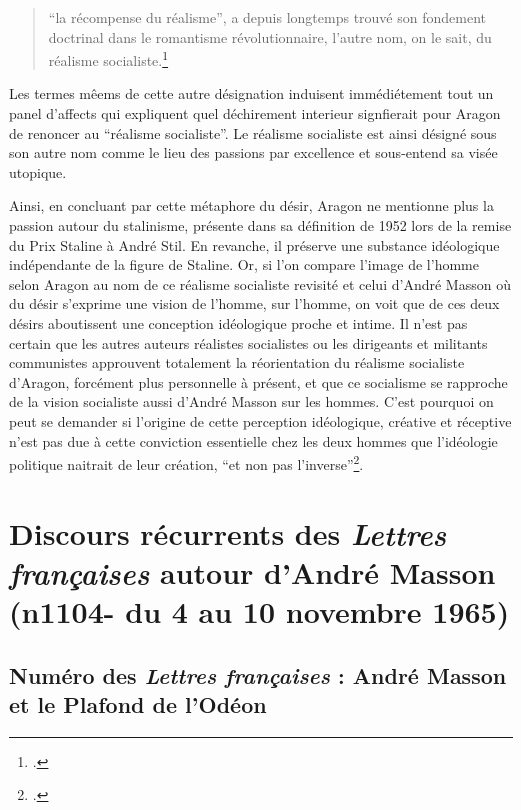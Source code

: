 \begin{quote}
\enquote{la récompense du réalisme}, a depuis longtemps trouvé son fondement doctrinal dans le romantisme révolutionnaire, l'autre nom, on le sait, du réalisme socialiste.\footcite[p1012]{these}\end{quote}

Les termes mêems de cette autre désignation induisent immédiétement tout un panel d'affects qui expliquent quel déchirement interieur signfierait pour Aragon de renoncer au \enquote{réalisme socialiste}. Le réalisme socialiste est ainsi désigné sous son autre nom comme le lieu des passions par excellence et sous-entend sa visée utopique. 


	 Ainsi, en concluant par cette métaphore du désir, Aragon ne mentionne plus la passion autour du stalinisme, présente dans sa définition de 1952 lors de la remise du Prix Staline à André Stil. En revanche, il préserve une substance idéologique indépendante de la figure de Staline. Or, si l’on compare l’image de l’homme selon Aragon au nom de ce réalisme socialiste revisité et celui d’André Masson où du désir s’exprime une vision de l’homme, sur l’homme, on voit que de ces deux désirs aboutissent une conception idéologique proche et intime. Il n’est pas certain que les autres auteurs réalistes socialistes ou les dirigeants et militants communistes approuvent totalement la réorientation du réalisme socialiste d’Aragon, forcément plus personnelle à présent, et que ce socialisme se rapproche de la vision socialiste aussi d’André Masson sur les hommes. C’est pourquoi on peut se demander si l’origine de cette perception idéologique, créative et réceptive n’est pas due à cette conviction essentielle chez les deux hommes que l’idéologie politique naitrait de leur création, \enquote{et non pas l’inverse}\footcite{}. 

\section{Discours récurrents des \emph{Lettres françaises} autour d’André Masson (n1104- du 4 au 10 novembre 1965)}  

\subsection{Numéro des \emph{Lettres françaises} : André Masson et le Plafond de l'Odéon }


